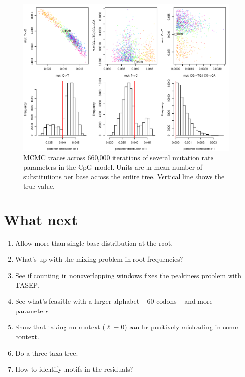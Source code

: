 \documentclass{article}
\theoremstyle{plain}
\theoremstyle{definition}
\begin{document}
\begin{figure}
  \begin{center}
    \includegraphics{writeup-plots/selsims-2013-06-03-13-17-0790276-mutrates}
  \end{center}
  \caption{ 
  MCMC traces across 660,000 iterations of several mutation rate parameters in the CpG model.
  Units are in mean number of substitutions per base across the entire tree.
  Vertical line shows the true value.
  }
\end{figure}


\section{What next}

\begin{enumerate}

  \item Allow more than single-base distribution at the root.

  \item What's up with the mixing problem in root frequencies?

  \item See if counting in nonoverlapping windows fixes the peakiness problem with TASEP.

  \item See what's feasible with a larger alphabet -- 60 codons -- and more parameters.

  \item Show that taking no context ($\ell=0$) can be positively misleading in some context.

  \item Do a three-taxa tree.

  \item How to identify motifs in the residuals?

\end{enumerate}
\end{document}
